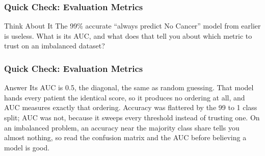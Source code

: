 





\begin{frame}[fragile]\frametitle{Quick Check: Evaluation Metrics}
\begin{block}{Think About It}
The 99\% accurate ``always predict No Cancer'' model from earlier is useless. What is its AUC, and what does that tell you about which metric to trust on an imbalanced dataset?
\end{block}
\end{frame}

\begin{frame}[fragile]\frametitle{Quick Check: Evaluation Metrics}
\begin{block}{Answer}
Its AUC is 0.5, the diagonal, the same as random guessing. That model hands every patient the identical score, so it produces no ordering at all, and AUC measures exactly that ordering. Accuracy was flattered by the 99 to 1 class split; AUC was not, because it sweeps every threshold instead of trusting one. On an imbalanced problem, an accuracy near the majority class share tells you almost nothing, so read the confusion matrix and the AUC before believing a model is good.
\end{block}
\end{frame}
